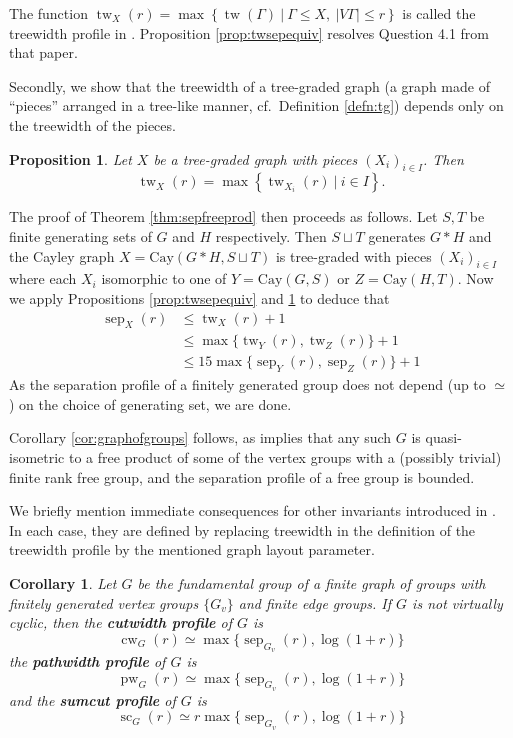\documentclass{article}
\numberwithin{equation}{section}
\newtheorem{proposition}[equation]{Proposition}
\newtheorem{corollary}[equation]{Corollary}
\theoremstyle{definition}
\theoremstyle{citing}
\DeclareMathOperator{\cw}{cw}
\DeclareMathOperator{\pw}{pw}
\DeclareMathOperator{\tw}{tw}
\DeclareMathOperator{\sumcut}{sc}
\DeclareMathOperator{\sep}{sep}
\newcommand{\setcon}[2]{\left\{#1\ \left|\ #2\right.\right\}}
\newcommand{\Cay}{\mathrm{Cay}}
\numberwithin{equation}{section}
\begin{document}
The function $\tw_X(r)=\max\setcon{\tw(\Gamma)}{\Gamma\leq X,\ |V\Gamma|\leq r}$ is called the treewidth profile in \cite{HHKL26}. Proposition \ref{prop:twsepequiv} resolves Question 4.1 from that paper.

Secondly, we show that the treewidth of a tree-graded graph (a graph made of ``pieces'' arranged in a tree-like manner, cf.\ Definition \ref{defn:tg}) depends only on the treewidth of the pieces.

\begin{proposition}\label{prop:twtg} Let $X$ be a tree-graded graph with pieces $(X_i)_{i\in I}$. Then
\[
    \tw_X(r) = \max\setcon{\tw_{X_i}(r)}{i\in I}.
\]
\end{proposition}

The proof of Theorem \ref{thm:sepfreeprod} then proceeds as follows. Let $S,T$ be finite generating sets of $G$ and $H$ respectively. Then $S\sqcup T$ generates $G*H$ and the Cayley graph $X=\Cay(G*H,S\sqcup T)$ is tree-graded with pieces $(X_i)_{i\in I}$ where each $X_i$ isomorphic to one of $Y=\Cay(G,S)$ or $Z=\Cay(H,T)$. Now we apply Propositions \ref{prop:twsepequiv} and \ref{prop:twtg} to deduce that
\begin{align*}
 \sep_X(r) & \leq \tw_X(r)+1 \\ &\leq \max\{\tw_Y(r),\tw_Z(r)\}+1 \\ & \leq 15\max\{\sep_Y(r),\sep_Z(r)\}+1
\end{align*}
As the separation profile of a finitely generated group does not depend (up to $\simeq$) on the choice of generating set, we are done.

Corollary \ref{cor:graphofgroups} follows, as \cite{PW02} implies that any such $G$ is quasi-isometric to a free product of some of the vertex groups with a (possibly trivial) finite rank free group, and the separation profile of a free group is bounded.

We briefly mention immediate consequences for other invariants introduced in \cite{HHKL26}. In each case, they are defined by replacing treewidth in the definition of the treewidth profile by the mentioned graph layout parameter.

\begin{corollary}\label{cor:graphofgroups2}
    Let $G$ be the fundamental group of a finite graph of groups with finitely generated vertex groups $\{G_v\}$ and finite edge groups. If $G$ is not virtually cyclic, then the \textbf{cutwidth profile} of $G$ is
    \[
        \cw_{G}(r)\simeq \max\{\sep_{G_v}(r),\log(1+r)\}
    \]
    the \textbf{pathwidth profile} of $G$ is
    \[
        \pw_{G}(r)\simeq \max\{\sep_{G_v}(r),\log(1+r)\}
    \]
    and the \textbf{sumcut profile} of $G$ is
    \[
        \sumcut_{G}(r)\simeq r\max\{\sep_{G_v}(r),\log(1+r)\}
    \]
\end{corollary}
\end{document}
